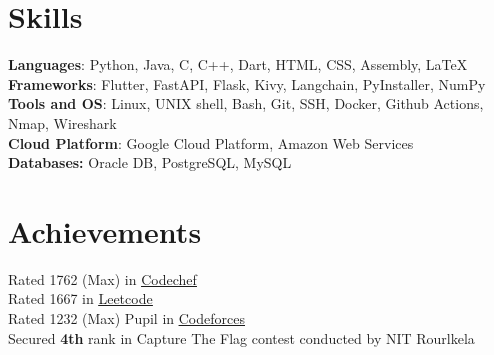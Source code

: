 
\resumeSubHeadingListEnd

%
\vspace{-10px}
\section{Skills}
\begin{itemize}[leftmargin=0.15in, label={}]
  \small{\item{
        \textbf{Languages}{: Python, Java, C, C++, Dart, HTML, CSS, Assembly, LaTeX} \\
        \textbf{Frameworks}{: Flutter, FastAPI, Flask, Kivy, Langchain, PyInstaller, NumPy} \\
        \textbf{Tools and OS}{: Linux, UNIX shell, Bash, Git, SSH, Docker, Github Actions, Nmap, Wireshark} \\
        \textbf{Cloud Platform}{: Google Cloud Platform, Amazon Web Services} \\
        \textbf{Databases: }{Oracle DB, PostgreSQL, MySQL} \\
        }}

\end{itemize}


%
\section{Achievements}
\begin{itemize}[leftmargin=0.15in, label={}]
  \small{\item{
        Rated 1762 (Max) in \href{https://www.codechef.com/users/ashu2909}
        {\underline{Codechef}} \\
        {Rated 1667 in \href{https://leetcode.com/ashu_coderc/}{\underline{Leetcode}}} \\
        Rated 1232 (Max) Pupil in \href{https://codeforces.com/profile/ashucoder}
        {\underline{Codeforces}} \\
        Secured \textbf{4th} rank in Capture The Flag contest conducted by NIT Rourlkela \\
        }}

\end{itemize}
